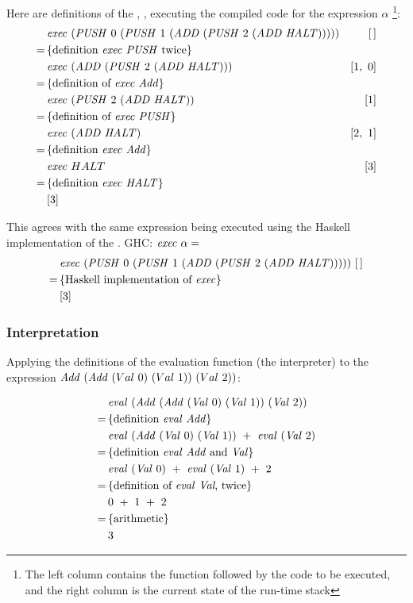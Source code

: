 \documentclass {article}
\begin{document}
Here are definitions of the \vm, \exec, 
executing the compiled code for the expression $\alpha$
\footnote{ The left column contains the function followed
by the code to be executed,
and the right column is the current state of the run-time stack}:
\begin{align*}
&\Exec (\PUSH 0\ (\PUSH 1\ (\ADD  (\PUSH 2\ (\ADD \HALT))))) &[\, ] \\
=\, & \{ \mbox{definition \exec\ \PUSHt\ twice} \} \\
&\Exec (\ADD  (\PUSH 2\ (\ADD \HALT))) 					&[1,\ 0] \\
=\, & \{ \mbox{definition of \exec\ \add} \} \\
&\Exec (\PUSH 2\ (\ADD \HALT)) 								&[1] \\
=\, & \{ \mbox{definition  of \exec\ \PUSHt} \} \\
&\Exec (\ADD \HALT)										 &[2,\ 1] \\
=\, & \{ \mbox{definition \exec\ \add} \} \\
&\Exec HALT 												&[3] \\
=\, & \{ \mbox{definition \exec\ \HALTt} \} \\
&[3]
\end{align*}

This agrees with the same expression being executed
using the Haskell implementation of the \vm.
GHC: \( \mathit{exec\ } \alpha =\)
\begin{align*}
&\mathit{exec\ } (\mathit{PUSH\ } 0\ (\mathit{PUSH\ } 1\ (\mathit{ADD\ }  (\mathit{PUSH\ } 2\ (\mathit{ADD\ }  \mathit{HALT})))))\ [\, ] \\
=\, & \{ \mbox{Haskell implementation of \textit{exec}} \} \\
&[3] 
\end{align*}

\subsubsection{Interpretation}

Applying the definitions of the evaluation function (the interpreter) to the expression
\( \Add (\Add (Val\ 0)\ (Val\ 1))\ (Val\ 2)) \):

\begin{align*}
	&\mathit{eval\ }  (\mathit{Add\ } (\mathit{Add\ } (\mathit{Val\ } 0)\ (\mathit{Val\ } 1))\ (\mathit{Val\ } 2)) \\
	=\, & \{ \mbox{definition \textit{eval}\ \textit{Add}} \} \\
	&\mathit{eval\ }  (\mathit{Add\ } (\mathit{Val\ } 0)\ (\mathit{Val\ } 1))\ +\ \mathit{eval\ }  (\mathit{Val\ } 2) \\
	=\, & \{ \mbox{definition \textit{eval}\ \textit{Add}\ and \textit{Val}} \} \\
	&\mathit{eval\ }  (\mathit{Val\ } 0)\ +\ \mathit{eval\ }  (\mathit{Val\ } 1)\ +\ 2 \\
	=\, & \{ \mbox{definition of \textit{eval}\ \textit{Val}, twice} \} \\
	&0\ +\ 1\ +\ 2 \\
	=\, & \{ \mbox{arithmetic} \} \\
	&3
\end{align*}
\end{document}
